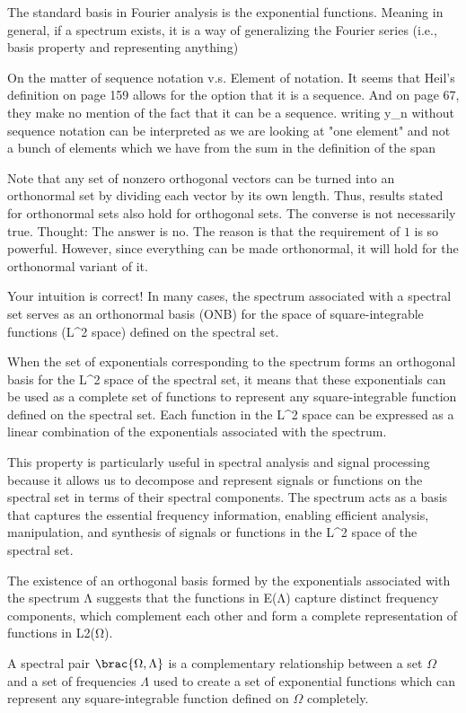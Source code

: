 
\qedhere

The standard basis in Fourier analysis is the exponential functions. 
Meaning in general, if a spectrum exists, it is a way of generalizing the Fourier series (i.e., basis property and representing anything)


On the matter of sequence notation v.s. Element of notation. It seems that Heil's definition on page 159 allows for the option that it is a sequence. And on page 67, they make no mention of the fact that it can be a sequence.
writing y_n without sequence notation can be interpreted as we are looking at "one element" and not a bunch of elements which we have from the sum in the definition of the span


Note that any set of nonzero orthogonal vectors can be turned into an orthonormal set by dividing each vector by its own length. 
Thus, results stated for orthonormal sets also hold for orthogonal sets. The converse is not necessarily true.
Thought: The answer is no. The reason is that the requirement of $1$ is so powerful. However, since everything can be made orthonormal, it will hold for the orthonormal variant of it. 



Your intuition is correct! In many cases, the spectrum associated with a spectral set serves as an orthonormal basis (ONB) for the space of square-integrable functions (L^2 space) defined on the spectral set.

When the set of exponentials corresponding to the spectrum forms an orthogonal basis for the L^2 space of the spectral set, it means that these exponentials can be used as a complete set of functions to represent any square-integrable function defined on the spectral set. Each function in the L^2 space can be expressed as a linear combination of the exponentials associated with the spectrum.

This property is particularly useful in spectral analysis and signal processing because it allows us to decompose and represent signals or functions on the spectral set in terms of their spectral components. The spectrum acts as a basis that captures the essential frequency information, enabling efficient analysis, manipulation, and synthesis of signals or functions in the L^2 space of the spectral set.

The existence of an orthogonal basis formed by the exponentials associated with the spectrum Λ suggests that the functions in E(Λ) capture distinct frequency components, which complement each other and form a complete representation of functions in L2(Ω).

A spectral pair $\brac{\Omega,\Lambda}$ is a complementary relationship between a set $\Omega$ and a set of frequencies $\Lambda$ used to create a set of exponential functions which can represent any square-integrable function defined on $\Omega$ completely. 